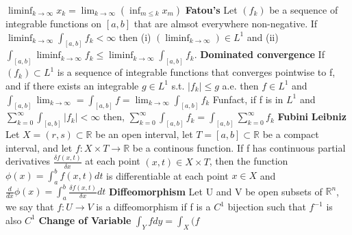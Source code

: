 \documentclass{article}
\theoremstyle{definition}
\begin{document}
$\liminf_{k \to \infty} x_k = \lim_{k \to \infty}(\inf_{m \leq k}x_m)$
\textbf{Fatou's} Let $(f_k)$ be a sequence of integrable functions on $[a,b]$ that are almsot everywhere non-negative. If $\liminf_{k \to \infty} \int _{[a,b]} f_k < \infty$ then (i) $(\liminf_{k \to \infty}) \in L^1$ and (ii) $\int_{[a,b]} \liminf_{k \to \infty} f_k \leq \liminf_{k \to \infty} \int _{[a,b]} f_k$.
\textbf{Dominated convergence} If $(f_k) \subset L^1$ is a sequence of integrable functions that converges pointwise to f, and if there exists an 
integrable $g\in L^1$ s.t. $|f_k| \leq g$ a.e. then $f \in L^1$ and $\int_{[a,b]} \lim_{k \to \infty} = \int_{[a,b]} f = \lim_{k \to \infty} \int_{[a,b]} f_k$
Funfact, if f is in $L^1$ and $\sum^\infty_{k=0}\int_{[a,b]}|f_k| < \infty$ then, $\sum^\infty_{k=0}\int_{[a,b]}f_k = \int_{[a,b]}\sum^\infty_{k=0}f_k$
\textbf{Fubini}
\textbf{Leibniz} Let $ X = (r,s) \subset \mathbb{R}$ be an open interval, let $T = [a,b] \subset \mathbb{R}$ be a compact interval, and let $f:X \times T \to \mathbb{R}$ be a continous function. If f has continuous partial derivatives $\frac{\delta f(x,t)}{\delta x}$ at each point $(x,t) \in X \times T$, then the function $\phi(x) = \int_a^b f(x,t) dt$ is differentiable at each point $x \in X$ and $\frac{d}{dx}\phi(x) = \int ^b_a \frac{\delta f(x,t)}{\delta x}dt$
\textbf{Diffeomorphism} Let U and V be open subsets of $\mathbb{R}^n$, we say that $f:U \to V$ is a diffeomorphism if f is a $C^1$ bijection such that $f^{-1}$ is also $C^1$
\textbf{Change of Variable} $\int_Y f dy = \int _X (f$
\end{document}
